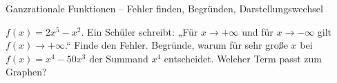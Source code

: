 \begin{aufgabe}{Ganzrationale Funktionen – Fehler finden, Begründen, Darstellungswechsel}
\begin{teile}
\teil $f(x) = 2x^5 - x^2$. Ein Schüler schreibt: „Für $x \to +\infty$ und für $x \to -\infty$ gilt $f(x) \to +\infty$.“ Finde den Fehler.
\teil Begründe, warum für sehr große $x$ bei $f(x) = x^4 - 50x^3$ der Summand $x^4$ entscheidet.
\teil Welcher Term passt zum Graphen?  \\  \\ 

\begin{ksys}[xmin=-4,xmax=4,ymin=-3,ymax=5,ablesen]  \end{ksys}
\end{teile}
\end{aufgabe}
